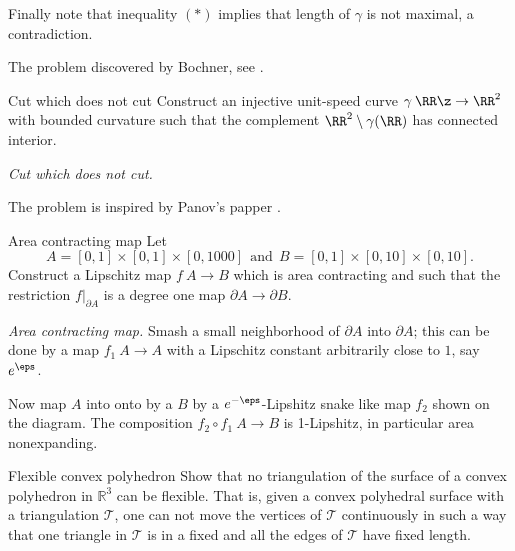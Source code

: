 Finally note that inequality $({*})$ implies that 
length of $\gamma$ is not maximal, a contradiction.

The problem discovered by Bochner, see \cite{bochner}.










\begin{pr}{\easy}{Cut which does not cut}\label{Cut which does not cut}
Construct an injective 
unit-speed curve 
$\gamma\:\RR\z\to\RR^2$ with bounded curvature
such that the complement $\RR^2\setminus\gamma(\RR)$ 
has connected interior.
\end{pr}


\textit{Cut which does not cut.}

 The problem is inspired by Panov's papper \cite{panov-torus}.







\begin{pr}{}{Area contracting map}\label{Area contracting map}
Let 
$$A=[0,1]\times[0,1]\times[0,1000]\ \ \text{and}\ \ B=[0,1]\times[0,10]\times[0,10].$$
Construct a Lipschitz map 
$f\:A\to B$ which is area contracting and such that the restriction $f|_{\partial A}$ 
is a degree one map $\partial A\to \partial B$.
\bigsign{\cite[\ref{guth-area-cnotractin}]{guth}}
\end{pr}


\textit{Area contracting map.}
Smash 
a small neighborhood of $\partial A$ into $\partial A$;
this can be done by a map $f_1\:A\to A$
with a Lipschitz constant arbitrarily close to $1$, say $e^\eps$.

Now map $A$ into onto by a  $B$ by a $e^{-\eps}$-Lipshitz snake like map $f_2$ shown on the diagram.
The composition $f_2\circ f_1\:A\to B$ is 1-Lipshitz, in particular area nonexpanding. 












\begin{pr}{\thm}{Flexible convex polyhedron}\label{Flexible convex polyhedron}
Show that no triangulation of the surface of a convex polyhedron in $\mathbb R^3$ 
can be flexible.
That is, given a convex polyhedral surface with a triangulation $\mathcal T$, one can not move the vertices of $\mathcal T$ continuously in such a way that one triangle in $\mathcal T$ is in a fixed
and 
all the edges of $\mathcal T$ have fixed length.
\end{pr}



